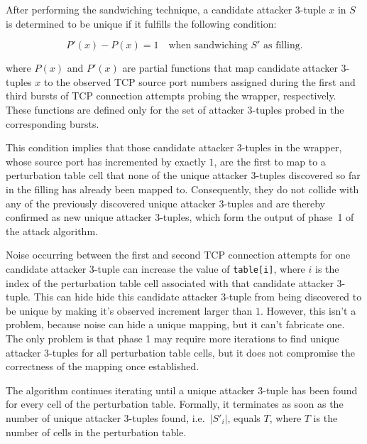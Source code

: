 \documentclass[twocolumn]{report}
\begin{document}
After performing the sandwiching technique, a \alert{candidate attacker 3-tuple} \( x \) in $S$ is determined to be \alert{unique} if it fulfills the following \alert{condition}:

\vspace{-0.2cm}
\begin{minipage}{\columnwidth}
	\begin{equation*}
		P'(x) - P(x) = 1
		\quad \text{when sandwiching } S' \text{ as filling.}
	\end{equation*}
\end{minipage}

where \(P(x)\) and \(P'(x)\) are partial functions that map \alert{candidate attacker 3-tuples \( x \) to} the observed \alert{TCP source port} numbers assigned during the first and third bursts of TCP connection attempts probing the wrapper, respectively. These functions are defined only for the set of attacker 3-tuples probed in the corresponding bursts.

This \alert{condition implies} that those candidate attacker 3-tuples in the wrapper, whose source port has incremented by exactly $1$, are the first to map to a perturbation table cell that none of the unique attacker 3-tuples discovered so far in the filling has already been mapped to. Consequently, they do not collide with any of the previously discovered unique attacker 3-tuples and are thereby confirmed as new \alert{unique attacker 3-tuples}, which form the \alert{output} of phase~1 of the attack algorithm.

\alert{Noise} occurring between the first and second TCP connection attempts for one candidate attacker 3-tuple can increase the value of \texttt{table[i]}, where $i$ is the index of the perturbation table cell associated with that candidate attacker 3-tuple. This \alert{can hide} hide this candidate attacker 3-tuple from being discovered to be unique by making it's observed increment larger than $1$. However, this isn’t a problem, because noise can hide a unique mapping, but it \alert{can’t fabricate} one. The only problem is that phase 1 may require more iterations to find unique attacker 3-tuples for all perturbation table cells, but it does not compromise the correctness of the mapping once established.

The algorithm continues iterating until a unique attacker 3-tuple has been found for every cell of the perturbation table. Formally, it \alert{terminates} as soon as the number of unique attacker 3-tuples found, i.e.\ $\lvert S'_i \rvert$, equals $T$, where $T$ is the number of cells in the perturbation table.
\end{document}
